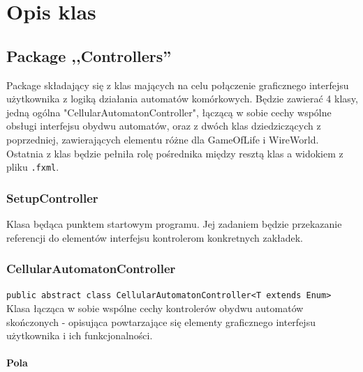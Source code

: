 \documentclass{report}
\begin{document}
\chapter{Opis klas}

\section{Package ,,Controllers''}
Package składający się z klas mających na celu połączenie graficznego interfejsu użytkownika z logiką działania automatów komórkowych. Będzie zawierać 4 klasy, jedną ogólna "CellularAutomatonController", łączącą w sobie cechy wspólne obsługi interfejsu obydwu automatów, oraz z dwóch klas dziedziczących z poprzedniej, zawierających elementu różne dla GameOfLife i WireWorld. Ostatnia z klas będzie pełniła rolę pośrednika między resztą klas a widokiem z pliku \texttt{.fxml}.

\subsection{SetupController}
Klasa będąca punktem startowym programu. Jej zadaniem będzie przekazanie referencji do elementów interfejsu kontrolerom konkretnych zakładek.

\subsection{CellularAutomatonController}
\texttt{public abstract class CellularAutomatonController<T extends Enum>}
Klasa łącząca w sobie wspólne cechy kontrolerów obydwu automatów skończonych - opisująca powtarzające się elementy graficznego interfejsu użytkownika i ich funkcjonalności.
\subsubsection{Pola}
\end{document}
